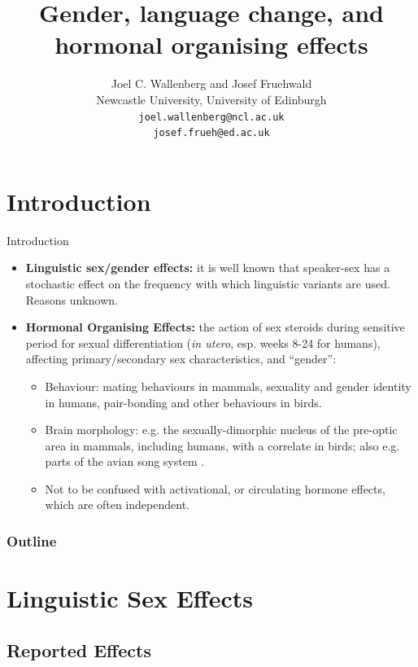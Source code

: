 \documentclass[hyperref={pdfpagelabels=false}]{beamer}
\title{Gender, language change, and hormonal organising effects}
\author{Joel C. Wallenberg and Josef Fruehwald\\Newcastle University, University of Edinburgh\\\texttt{joel.wallenberg@ncl.ac.uk\\ josef.frueh@ed.ac.uk}}
\begin{document}
\begin{frame}[plain]
\titlepage
\end{frame}


\section{Introduction}
\begin{frame}{Introduction}

	
	\begin{itemize}
		\item \textbf{Linguistic sex/gender effects:} it is well known that speaker-sex has a stochastic effect on the frequency with which linguistic variants are used. Reasons unknown.
		\item \textbf{Hormonal Organising Effects:} the action of sex steroids during sensitive period for sexual differentiation 
		(\textsl{in utero}, esp. weeks 8-24 for humans), affecting primary/secondary sex characteristics, and ``gender'':
			\begin{itemize}
				\item Behaviour: mating behaviours in mammals, sexuality and gender identity in humans, pair-bonding and other behaviours in birds.
				\item Brain morphology: e.g. the sexually-dimorphic nucleus of the pre-optic area in mammals, including humans, with a correlate in birds; also e.g. parts of the avian song system \citep[][]{balthazartetal2009}.
				\item Not to be confused with activational, or circulating hormone effects, which are often independent.
			\end{itemize}
	\end{itemize}
	
\end{frame}


\begin{frame}
\frametitle{Outline}
\tableofcontents
\end{frame}


\section{Linguistic Sex Effects}
\subsection{Reported Effects}
\end{document}
